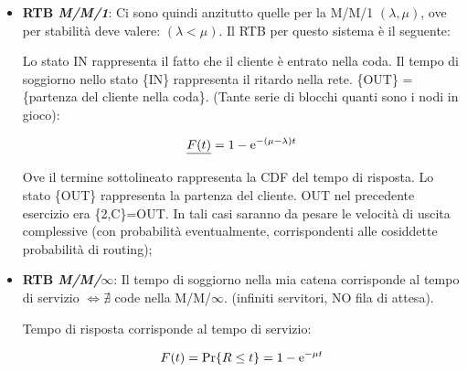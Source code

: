 \begin{itemize}

\item{\textbf{RTB \textit{M/M/1}}}: Ci sono quindi anzitutto quelle per la M/M/1 $(\lambda,\mu)$, ove per stabilità deve valere: $(\lambda<\mu)$. Il RTB per questo sistema è il seguente:

\begin{center}
\end{center}

Lo stato IN rappresenta il fatto che il cliente è entrato nella coda. Il tempo di soggiorno nello stato \{IN\} rappresenta il ritardo nella rete. \{OUT\} = \{partenza del cliente nella coda\}. (Tante serie di blocchi quanti sono i nodi in gioco):

\[
	\underline{F(t)} = 1-\mathop{}\!\mathrm{e}^{-(\mu-\lambda)t}
\]

Ove il termine sottolineato rappresenta la CDF del tempo di risposta. Lo stato \{OUT\} rappresenta la partenza del cliente. OUT nel precedente esercizio era \{2,C\}=OUT. In tali casi saranno da pesare le velocità di uscita complessive (con probabilità eventualmente, corrispondenti alle cosiddette probabilità di routing);

\item{\textbf{RTB \textit{M/M/$\infty$}}}: Il tempo di soggiorno nella mia catena corrisponde al tempo di servizio $\iff \nexists$ code nella M/M/$\infty$. (infiniti servitori, NO fila di attesa). 

\begin{center}
\end{center}

Tempo di risposta corrisponde al tempo di servizio:

\[
	F(t) = \Pr\{R\leq t\}=1-\mathop{}\!\mathrm{e}^{-\mu t}
\]


\end{itemize}
